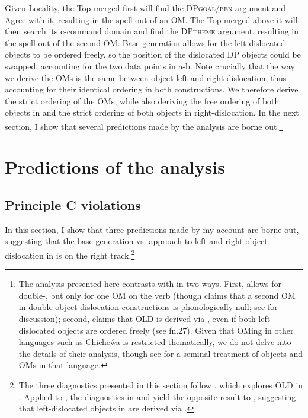 \documentclass[output=paper,newtxmath,modfonts,nonflat,hidelinks]{langsci/langscibook}
\begin{document}
{Given Locality, the Top merged first will find the DP}\textsc{goal/ben} {argument and Agree with it, resulting in the spell-out of an OM. The Top merged above it will then search its c-command domain and find the DP}\textsc{theme} {argument, resulting in the spell-out of the second OM. Base generation allows for the left-dislocated objects to be ordered freely, so the position of the dislocated DP objects could be swapped, accounting for the two data points in a-b. Note crucially that the way we derive the OMs is the same between object left and right-dislocation, thus accounting for their identical ordering in both constructions. We therefore derive the strict ordering of the OMs, while also deriving the free ordering of both objects in  and the strict ordering of both objects in right-dislocation. In the next section, I show that several predictions made by the analysis are borne out.}\footnote{The analysis presented here contrasts with  in two ways. First,  allows for double-, but only for one OM on the verb (though \citealt{Adams2010} claims that a second OM in double object-dislocation constructions is phonologically null; see \citealt{Zeller2015} for discussion); second, \citet{zeller2009} claims that OLD is derived via , even if both left-dislocated objects are ordered freely (see fn.27). Given that OMing in other languages such as Chiche\^wa is restricted thematically, we do not delve into the details of their analysis, though see \citet{Bresnan1987} for a seminal treatment of objects and OMs in that language.}


\section{Predictions of the analysis}\label{sec:ranero:5}
\subsection{Principle C violations}\label{sec:ranero:5.1}

{In this section, I show that three predictions made by my account are borne out, suggesting that the base generation vs.  approach to left and right object-dislocation in  is on the right track}.\footnote{The three diagnostics presented in this section follow \citet{zeller2009}, which explores OLD in . Applied to , the diagnostics in  and  yield the opposite result to , suggesting that left-dislocated objects in  are derived via .} 
\end{document}
